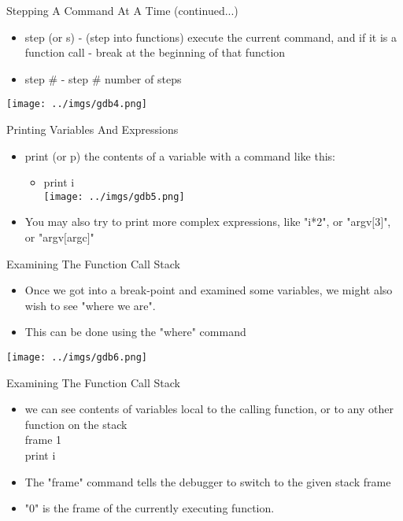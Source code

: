 \documentclass{beamer}
\begin{document}
\begin{frame}{Stepping A Command At A Time (continued...)}
\begin{itemize}
\item step (or s) - (step into functions) execute the current command, and if it is a function call - break at the beginning of that function 
\item step \# - step \# number of steps
\end{itemize}
\texttt{[image: ../imgs/gdb4.png]}
\end{frame}

\begin{frame}{Printing Variables And Expressions}
\begin{itemize}
\item print (or p) the contents of a variable with a command like this: 
\begin{itemize}
\item print i \\
\texttt{[image: ../imgs/gdb5.png]}
\end{itemize}
\item You may also try to print more complex expressions, like "i*2", or "argv$[$3$]$", or "argv$[$argc$]$"
\end{itemize}
\end{frame}

\begin{frame}{Examining The Function Call Stack}
\begin{itemize}
\item Once we got into a break-point and examined some variables, we might also wish to see "where we are". 
\item This can be done using the "where" command 
\end{itemize}
\texttt{[image: ../imgs/gdb6.png]}
\end{frame}

\begin{frame}{Examining The Function Call Stack}
\begin{itemize}
\item we can see contents of variables local to the calling function, or to any other function on the stack \\
frame 1 \\
print i  
\item The "frame" command tells the debugger to switch to the given stack frame
\item "0" is the frame of the currently executing function. 
\end{itemize}
\end{frame}
\end{document}
